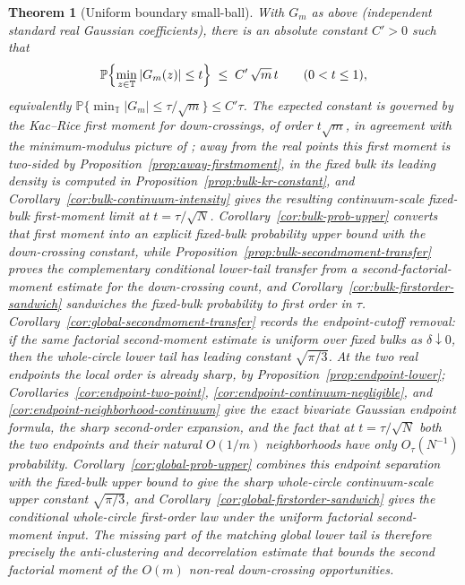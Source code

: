 \documentclass[11pt]{amsart}
\numberwithin{equation}{section}
\newtheorem{theorem}{Theorem}[section]
\theoremstyle{definition}
\theoremstyle{remark}
\newcommand{\T}{\mathbb T}
\newcommand{\Prob}{\mathbb P}
\newcommand{\abs}[1]{\left\lvert #1\right\rvert}
\begin{document}
\begin{theorem}[Uniform boundary small-ball]\label{thm:uniform}
With $G_m$ as above (independent standard real Gaussian coefficients), there is an absolute constant $C'>0$ such that
\begin{equation}\label{eq:uniform}
  \Prob\Bigl\{\min_{z\in\T}\abs{G_m(z)}\le t\Bigr\}\;\le\;C'\,\sqrt m\,t
  \qquad(0<t\le1),
\end{equation}
equivalently
\(\Prob\{\min_{\T}\abs{G_m}\le\tau/\sqrt m\}\le C'\tau\). The expected
constant is governed by the Kac--Rice first moment for down-crossings, of order
\(t\sqrt m\), in agreement with the minimum-modulus picture of
\cite{KMS,YakirZeitouni,CookNguyen}; away from the real points this first
moment is two-sided by Proposition~\ref{prop:away-firstmoment}, in the fixed
bulk its leading density is computed in Proposition~\ref{prop:bulk-kr-constant},
and Corollary~\ref{cor:bulk-continuum-intensity} gives the resulting
continuum-scale fixed-bulk first-moment limit at \(t=\tau/\sqrt N\).
Corollary~\ref{cor:bulk-prob-upper} converts that first moment into an explicit
fixed-bulk probability upper bound with the down-crossing constant, while
Proposition~\ref{prop:bulk-secondmoment-transfer} proves the complementary
conditional lower-tail transfer from a second-factorial-moment estimate for the
down-crossing count, and Corollary~\ref{cor:bulk-firstorder-sandwich} sandwiches
the fixed-bulk probability to first order in \(\tau\).
Corollary~\ref{cor:global-secondmoment-transfer} records the endpoint-cutoff
removal: if the same factorial second-moment estimate is uniform over fixed
bulks as \(\delta\downarrow0\), then the whole-circle lower tail has leading
constant \(\sqrt{\pi/3}\).  At the two real endpoints the local
order is already sharp, by Proposition~\ref{prop:endpoint-lower};
Corollaries~\ref{cor:endpoint-two-point},
\ref{cor:endpoint-continuum-negligible}, and
\ref{cor:endpoint-neighborhood-continuum} give the exact bivariate Gaussian
endpoint formula, the sharp second-order expansion, and the fact that at
\(t=\tau/\sqrt N\) both the two endpoints and their natural \(O(1/m)\)
neighborhoods have only \(O_\tau(N^{-1})\) probability.
Corollary~\ref{cor:global-prob-upper} combines this endpoint separation with
the fixed-bulk upper bound to give the sharp whole-circle continuum-scale upper
constant \(\sqrt{\pi/3}\), and
Corollary~\ref{cor:global-firstorder-sandwich} gives the conditional
whole-circle first-order law under the uniform factorial second-moment input.
The missing part of the matching global lower tail is therefore precisely the
anti-clustering and decorrelation estimate that bounds the second factorial
moment of the \(O(m)\) non-real down-crossing opportunities.
\end{theorem}
\end{document}
